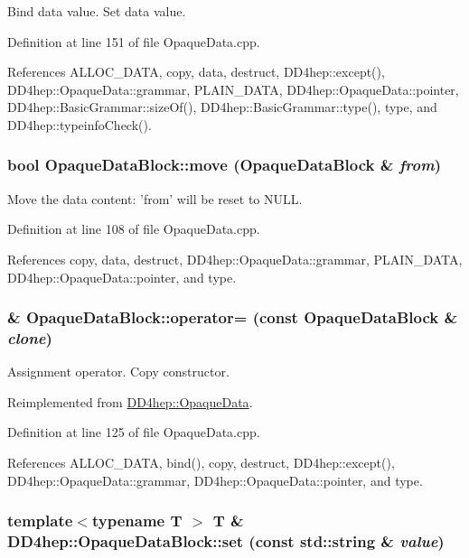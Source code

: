 Bind data value. Set data value. 

Definition at line 151 of file OpaqueData.cpp.

References ALLOC\_\-DATA, copy, data, destruct, DD4hep::except(), DD4hep::OpaqueData::grammar, PLAIN\_\-DATA, DD4hep::OpaqueData::pointer, DD4hep::BasicGrammar::sizeOf(), DD4hep::BasicGrammar::type(), type, and DD4hep::typeinfoCheck().\hypertarget{class_d_d4hep_1_1_opaque_data_block_a488c26189a1d06ed642a335be951af7b}{
\subsubsection[{move}]{\setlength{\rightskip}{0pt plus 5cm}bool OpaqueDataBlock::move ({\bf OpaqueDataBlock} \& {\em from})}}
\label{class_d_d4hep_1_1_opaque_data_block_a488c26189a1d06ed642a335be951af7b}


Move the data content: 'from' will be reset to NULL. 

Definition at line 108 of file OpaqueData.cpp.

References copy, data, destruct, DD4hep::OpaqueData::grammar, PLAIN\_\-DATA, DD4hep::OpaqueData::pointer, and type.\hypertarget{class_d_d4hep_1_1_opaque_data_block_a9fa632b86dc6203b7077c9f09cb23853}{
\subsubsection[{operator=}]{ \& OpaqueDataBlock::operator= (const {\bf OpaqueDataBlock} \& {\em clone})}}
\label{class_d_d4hep_1_1_opaque_data_block_a9fa632b86dc6203b7077c9f09cb23853}


Assignment operator. Copy constructor. 

Reimplemented from \hyperlink{class_d_d4hep_1_1_opaque_data_ab939ef76406d35f26e6913a392741e72}{DD4hep::OpaqueData}.

Definition at line 125 of file OpaqueData.cpp.

References ALLOC\_\-DATA, bind(), copy, destruct, DD4hep::except(), DD4hep::OpaqueData::grammar, DD4hep::OpaqueData::pointer, and type.\hypertarget{class_d_d4hep_1_1_opaque_data_block_a69737512e448c58b88d34095b9155e53}{
\subsubsection[{set}]{\setlength{\rightskip}{0pt plus 5cm}template$<$typename T $>$ {\bf T} \& DD4hep::OpaqueDataBlock::set (const std::string \& {\em value})}}
\label{class_d_d4hep_1_1_opaque_data_block_a69737512e448c58b88d34095b9155e53}


